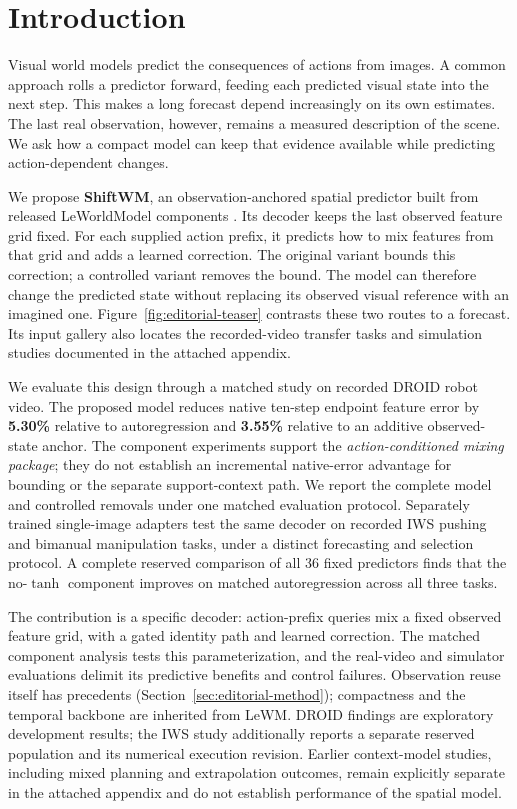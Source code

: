\section{Introduction}
Visual world models predict the consequences of actions from images. A common
approach rolls a predictor forward, feeding each predicted visual state into
the next step. This makes a long forecast depend increasingly on its own
estimates. The last real observation, however, remains a measured description
of the scene. We ask how a compact model can keep that evidence available
while predicting action-dependent changes.

We propose \textbf{ShiftWM}, an observation-anchored spatial predictor built
from released LeWorldModel components \citep{maes2026lewm}. Its decoder keeps
the last observed feature grid fixed. For each supplied action prefix, it
predicts how to mix features from that grid and adds a learned correction.
The original variant bounds this correction; a controlled variant removes the bound.
The model can therefore change the predicted state without replacing its
observed visual reference with an imagined one.
Figure~\ref{fig:editorial-teaser} contrasts these two routes to a forecast.
Its input gallery also locates the recorded-video transfer tasks and simulation
studies documented in the attached appendix.



We evaluate this design through a matched study on recorded DROID robot video.
The proposed model reduces native ten-step endpoint feature error by
\textbf{5.30\%} relative to autoregression and \textbf{3.55\%} relative to an
additive observed-state anchor. The component experiments support the
\emph{action-conditioned mixing package}; they do not establish an incremental
native-error advantage for bounding or the separate support-context path.
We report the complete model and controlled removals under one matched
evaluation protocol.
Separately trained single-image adapters test the same decoder on recorded
IWS pushing and bimanual manipulation tasks, under a distinct forecasting
and selection protocol. A complete reserved comparison of all 36 fixed
predictors finds that the no-$\tanh$ component improves on matched
autoregression across all three tasks.

The contribution is a specific decoder: action-prefix queries mix a fixed
observed feature grid, with a gated identity path and learned correction.
The matched component analysis tests this parameterization, and the real-video
and simulator evaluations delimit its predictive benefits and control failures.
Observation reuse itself has precedents (Section~\ref{sec:editorial-method});
compactness and the temporal backbone are inherited from LeWM. DROID findings are exploratory development results; the
IWS study additionally reports a separate reserved population and its numerical
execution revision. Earlier context-model
studies, including mixed planning and extrapolation outcomes, remain explicitly
separate in the attached appendix and do not establish performance of the
spatial model.

